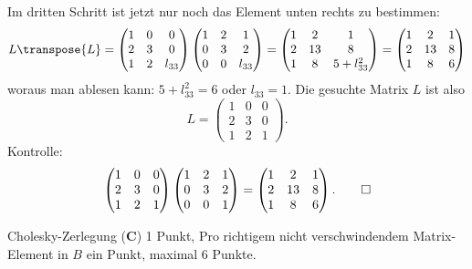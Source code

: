 \begin{loesung}
Im dritten Schritt ist jetzt nur noch das Element unten rechts zu bestimmen:
\[
L\transpose{L}=
\begin{pmatrix}
1&0&     0\\
2&3&     0\\
1&2&l_{33}
\end{pmatrix}
\begin{pmatrix}
1&2&     1\\
0&3&     2\\
0&0&l_{33}
\end{pmatrix}
=
\begin{pmatrix}
1& 2&1\\
2&13&8\\
1& 8&5+l_{33}^2
\end{pmatrix}
=
\begin{pmatrix}
1& 2&1\\
2&13&8\\
1& 8&6
\end{pmatrix}
\]
woraus man ablesen kann: $5+l_{33}^2=6$ oder $l_{33}=1$. Die gesuchte
Matrix $L$ ist also
\[
L=
\begin{pmatrix}
1&0&0\\
2&3&0\\
1&2&1
\end{pmatrix}.
\]
Kontrolle:
\[
\begin{pmatrix}
1&0&0\\
2&3&0\\
1&2&1
\end{pmatrix}
\begin{pmatrix}
1&2&1\\
0&3&2\\
0&0&1
\end{pmatrix}
=
\begin{pmatrix}
1& 2&1\\
2&13&8\\
1& 8&6
\end{pmatrix}.
\qedhere
\]
\end{loesung}

\begin{bewertung}
Cholesky-Zerlegung ({\bf C}) 1 Punkt,
Pro richtigem nicht verschwindendem Matrix-Element in $B$ ein Punkt,
maximal 6 Punkte.
\end{bewertung}


